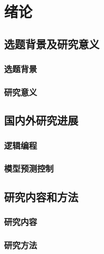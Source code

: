 \chapter{绪论}

    \section{选题背景及研究意义}
    
        \subsection{选题背景}
        
        \subsection{研究意义}
    
    \section{国内外研究进展}

        \subsection{逻辑编程}

        \subsection{模型预测控制}

    \section{研究内容和方法}

        \subsection{研究内容}

        \subsection{研究方法}

